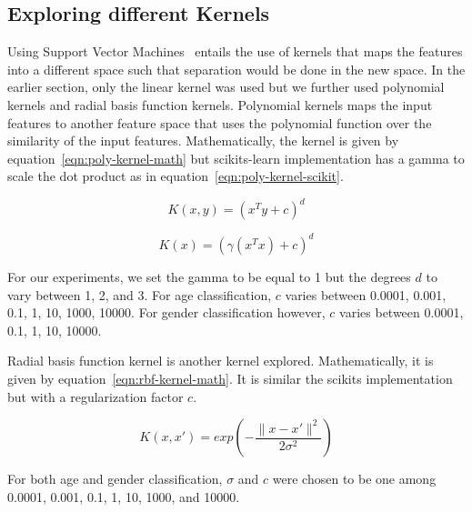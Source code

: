 \documentclass[a4paper]{llncs}
\begin{document}
\subsection{Exploring different Kernels}
Using Support Vector Machines~\cite{cortes1995support} entails the use of kernels that maps the features into a different space such that separation would be done in the new space. In the earlier section, only the linear kernel was used but we further used polynomial kernels and radial basis function kernels. Polynomial kernels maps the input features to another feature space that uses the polynomial function over the similarity of the input features. Mathematically, the kernel is given by equation~\ref{eqn:poly-kernel-math} but scikits-learn implementation has a gamma to scale the dot product as in equation~\ref{eqn:poly-kernel-scikit}.

\begin{equation}
K(x,y) = (x^Ty + c)^d
\label{eqn:poly-kernel-math}
\end{equation}

\begin{equation}
K(x) = (\gamma(x^Tx)+c)^d
\label{eqn:poly-kernel-scikit}
\end{equation}

For our experiments, we set the gamma to be equal to 1 but the degrees $d$ to vary between 1, 2, and 3. For age classification, $c$ varies between 0.0001, 0.001, 0.1, 1, 10, 1000, 10000. For gender classification however, $c$ varies  between 0.0001, 0.1, 1, 10, 10000.  

Radial basis function kernel is another kernel explored. Mathematically, it is given by equation~\ref{eqn:rbf-kernel-math}. It is similar the scikits implementation but with a regularization factor $c$. 

\begin{equation}
K(x,x')= exp\left( -\frac{\parallel x-x'\parallel^2}{2\sigma^2} \right)
\label{eqn:rbf-kernel-math}
\end{equation} 

For both age and gender classification, $\sigma$ and $c$ were chosen to be one among 0.0001, 0.001, 0.1, 1, 10, 1000, and 10000.
\end{document}

